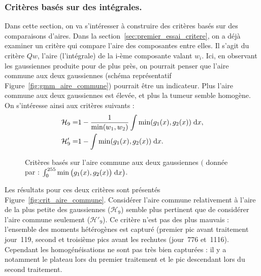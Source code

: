 \documentclass[main.tex]{subfiles}
\begin{document}
\subsubsection{Critères basés sur des intégrales.}
Dans cette section, on va s'intéresser à construire des critères basés sur des comparaisons  d'aires. Dans la section~\ref{sec:premier_essai_critere}, on a déjà examiner un critère qui compare l'aire des composantes entre elles. Il s'agit du critère $Qw$, l'aire (l'intégrale) de la i-ème composante valant $w_i$. 
Ici, en observant les gaussiennes produite pour \Nber de plus près, on pourrait penser que l'aire commune aux deux gaussiennes (\cf schéma représentatif Figure~\ref{fig:gmm_aire_commune}) pourrait être un indicateur. Plus l'aire commune aux deux gaussiennes est élevée, et plus la tumeur semble homogène.  On s'intéresse ainsi aux critères suivants :
\begin{align}
\mathcal{H}_9 =& 1 - \dfrac{ 1 }{\min(w_1,w_2)}\int \min(g_1(x),g_2(x)) \;{\rm d}x, \\
\mathcal{H}'_9 =& 1-\int \min(g_1(x),g_2(x)) \;{\rm d}x.
\end{align}
\begin{figure}
\caption{Critères basés sur l'aire commune aux deux gaussiennes $\big($ donnée par : $\int_0^{255} \min \big(g_1(x),g_2(x) \big) \;{\rm d}x \big)$.}
\end{figure}
Les résultats pour ces deux critères sont présentés  Figure~\ref{fig:crit_aire_commune}. 
Considérer l'aire commune relativement à l'aire de la plus petite des gaussiennes ($\mathcal{H}_9$) semble plus pertinent que de considérer l'aire commune seulement ($\mathcal{H}'_9$). Ce critère n'est pas des plus mauvais : l'ensemble des moments hétérogènes est capturé (premier pic avant traitement jour~119, second et troisième pics avant les rechutes (jour~776 et~1116). Cependant les homogénéisations ne sont pas très bien capturées : il y a notamment le plateau lors du premier traitement et le pic descendant lors du second traitement.
\end{document}
